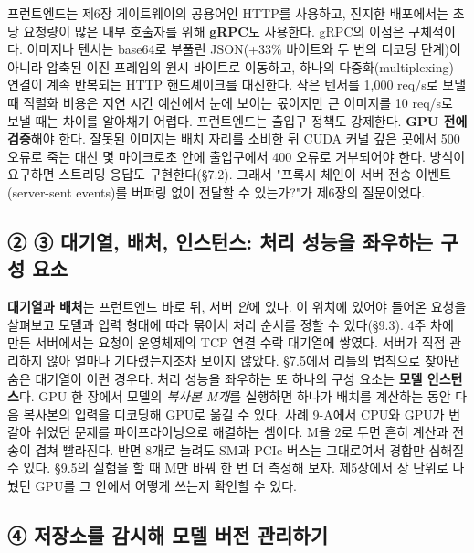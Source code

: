 프런트엔드는 제6장 게이트웨이의 공용어인 HTTP를 사용하고, 진지한 배포에서는 초당 요청량이 많은 내부 호출자를 위해 \textbf{gRPC}도 사용한다. gRPC의 이점은 구체적이다. 이미지나 텐서는 base64로 부풀린 JSON(+33\% 바이트와 두 번의 디코딩 단계)이 아니라 압축된 이진 프레임의 원시 바이트로 이동하고, 하나의 다중화(multiplexing) 연결이 계속 반복되는 HTTP 핸드셰이크를 대신한다. 작은 텐서를 1,000 req/s로 보낼 때 직렬화 비용은 지연 시간 예산에서 눈에 보이는 몫이지만 큰 이미지를 10 req/s로 보낼 때는 차이를 알아채기 어렵다. 프런트엔드는 출입구 정책도 강제한다. \textbf{GPU 전에 검증}해야 한다. 잘못된 이미지는 배치 자리를 소비한 뒤 CUDA 커널 깊은 곳에서 500 오류로 죽는 대신 몇 마이크로초 안에 출입구에서 400 오류로 거부되어야 한다. 방식이 요구하면 스트리밍 응답도 구현한다(§7.2). 그래서 "프록시 체인이 서버 전송 이벤트(server-sent events)를 버퍼링 없이 전달할 수 있는가?"가 제6장의 질문이었다.

\subsection*{② ③ 대기열, 배처, 인스턴스: 처리 성능을 좌우하는 구성 요소}

\textbf{대기열과 배처}는 프런트엔드 바로 뒤, 서버 \textit{안}에 있다. 이 위치에 있어야 들어온 요청을 살펴보고 모델과 입력 형태에 따라 묶어서 처리 순서를 정할 수 있다(§9.3). 4주 차에 만든 서버에서는 요청이 운영체제의 TCP 연결 수락 대기열에 쌓였다. 서버가 직접 관리하지 않아 얼마나 기다렸는지조차 보이지 않았다. §7.5에서 리틀의 법칙으로 찾아낸 숨은 대기열이 이런 경우다. 처리 성능을 좌우하는 또 하나의 구성 요소는 \textbf{모델 인스턴스}다. GPU 한 장에서 모델의 \textit{복사본 M개}를 실행하면 하나가 배치를 계산하는 동안 다음 복사본의 입력을 디코딩해 GPU로 옮길 수 있다. 사례 9-A에서 CPU와 GPU가 번갈아 쉬었던 문제를 파이프라이닝으로 해결하는 셈이다. M을 2로 두면 흔히 계산과 전송이 겹쳐 빨라진다. 반면 8개로 늘려도 SM과 PCIe 버스는 그대로여서 경합만 심해질 수 있다. §9.5의 실험을 할 때 M만 바꿔 한 번 더 측정해 보자. 제5장에서 장 단위로 나눴던 GPU를 그 안에서 어떻게 쓰는지 확인할 수 있다.

\subsection*{④ 저장소를 감시해 모델 버전 관리하기}

